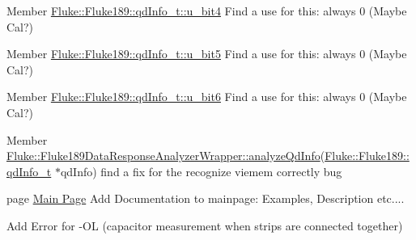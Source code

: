 \label{todo__todo000012}
\hypertarget{todo__todo000012}{}
 
\begin{DoxyDescription}
\item[Member \hyperlink{structFluke_1_1Fluke189_1_1qdInfo__t_a012174b29b7e6686a724204f63a09c91}{Fluke::Fluke189::qdInfo\_\-t::u\_\-bit4} ]Find a use for this: always 0 (Maybe Cal?) 
\end{DoxyDescription}

\label{todo__todo000013}
\hypertarget{todo__todo000013}{}
 
\begin{DoxyDescription}
\item[Member \hyperlink{structFluke_1_1Fluke189_1_1qdInfo__t_ad123acd44f39185d0903250085834b72}{Fluke::Fluke189::qdInfo\_\-t::u\_\-bit5} ]Find a use for this: always 0 (Maybe Cal?) 
\end{DoxyDescription}

\label{todo__todo000014}
\hypertarget{todo__todo000014}{}
 
\begin{DoxyDescription}
\item[Member \hyperlink{structFluke_1_1Fluke189_1_1qdInfo__t_a3a48f6b82d6abd8613a7f7f091c7ad16}{Fluke::Fluke189::qdInfo\_\-t::u\_\-bit6} ]Find a use for this: always 0 (Maybe Cal?) 
\end{DoxyDescription}

\label{todo__todo000022}
\hypertarget{todo__todo000022}{}
 
\begin{DoxyDescription}
\item[Member \hyperlink{classFluke_1_1Fluke189DataResponseAnalyzerWrapper_a2bec1dad601bc993375d358ef77c7e6b}{Fluke::Fluke189DataResponseAnalyzerWrapper::analyzeQdInfo}(\hyperlink{structFluke_1_1Fluke189_1_1qdInfo__t}{Fluke::Fluke189::qdInfo\_\-t} $\ast$qdInfo) ]find a fix for the recognize viemem correctly bug 
\end{DoxyDescription}

\label{todo__todo000001}
\hypertarget{todo__todo000001}{}
 
\begin{DoxyDescription}
\item[page \hyperlink{index}{Main Page} ]Add Documentation to mainpage: Examples, Description etc.... 

Add Error for -\/OL (capacitor measurement when strips are connected together) 
\end{DoxyDescription}